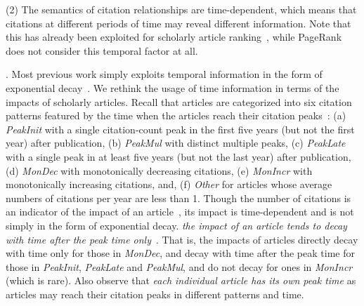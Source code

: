 \noindent(2) The semantics of citation relationships are time-dependent, which means that citations at different periods of time may reveal different information. Note that this has already been exploited for scholarly article ranking~\cite{Li08TSRanking,Wang13AAAI,WalkerXKM07}, while PageRank does not consider this temporal factor at all.

. Most previous work simply exploits temporal information in the form of exponential decay~\cite{Li08TSRanking,Wang13AAAI,sayyadi09,WalkerXKM07}. We rethink the usage of time information in terms of the impacts of scholarly articles.
Recall that articles are categorized  into six citation patterns featured by the time when the articles reach their citation peaks~\cite{Chakraborty15}: (a) {\em PeakInit} with a single citation-count peak in the first five years (but not the first year) after publication, (b) {\em PeakMul} with distinct multiple peaks, (c) {\em PeakLate} with a single peak in at least five years   (but not the last year) after publication, (d) {\em MonDec} with monotonically decreasing citations, (e) {\em MonIncr} with monotonically increasing citations, and, (f) {\em Other} for articles whose average numbers of citations per year are less than 1. Though the number of citations is an indicator of the impact of an article~\cite{WangSB13,Garfield471}, its impact is time-dependent and is not simply in the form of exponential decay.
 {\em the impact of an article tends to decay with time after the peak time only}~\cite{WangSB13}. That is, the impacts of articles directly decay with time only for those in {\em MonDec}, and decay with time after the peak time for those in {\em PeakInit}, {\em PeakLate} and {\em PeakMul}, and do not decay for ones in {\em MonIncr} (which is rare).
Also observe that {\em each individual article has its own peak time} as articles may reach their citation peaks in different patterns and time.


